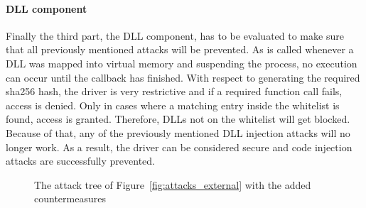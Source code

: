 \paragraph{\gls{DLL} component}
Finally the third part, the \gls{DLL} component, has to be evaluated to make sure that all previously mentioned attacks will be prevented. As  is called whenever a \gls{DLL} was mapped into virtual memory and suspending the process, no execution can occur until the callback has finished. With respect to generating the required sha256 hash, the driver is very restrictive and if a required function call fails, access is denied. Only in cases where a matching entry inside the whitelist is found, access is granted. Therefore, \glspl{DLL} not on the whitelist will get blocked. Because of that, any of the previously mentioned \gls{DLL} injection attacks will no longer work. As a result, the driver can be considered secure and code injection attacks are successfully prevented.
\pagestyle{empty}
\begin{figure}[h] 
 \centering
\caption{The attack tree of Figure~\ref{fig:attacks_external} with the added countermeasures}
\label{fig:attacks_external_def}
\end{figure}
\restoregeometry
\pagestyle{plain}